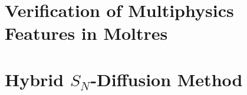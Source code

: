 \documentclass[edeposit,fullpage,11pt]{uiucthesis2021}
\begin{document}
\chapter{Verification of Multiphysics Features in Moltres}
\label{chap:verification}
%

\chapter{Hybrid $S_N$-Diffusion Method}
\label{chap:hybrid}

\glsresetall

%

\backmatter



\end{document}
